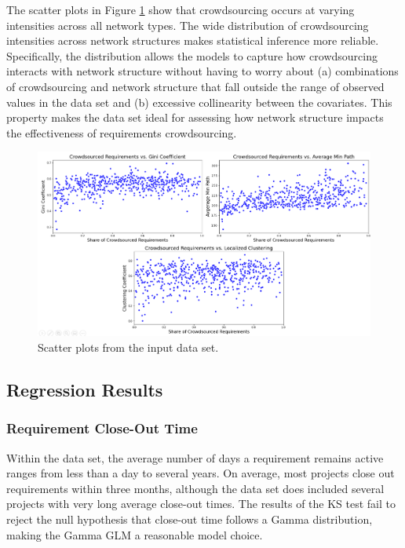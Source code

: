 The scatter plots in Figure \ref{network_structure_scatter} show that crowdsourcing occurs at varying intensities across all network types. The wide distribution of crowdsourcing intensities across network structures makes statistical inference more reliable. Specifically, the distribution allows the models to capture how crowdsourcing interacts with network structure without having to worry about (a) combinations of crowdsourcing and network structure that fall outside the range of observed values in the data set and (b) excessive collinearity between the covariates. This property makes the data set ideal for assessing how network structure impacts the effectiveness of requirements crowdsourcing.

\begin{figure}
  \includegraphics[width=.95\textwidth]{network_structure_scatter.PNG}
\caption{Scatter plots from the input data set.}
\label{network_structure_scatter}
\end{figure}

\subsection{Regression Results}

\subsubsection{Requirement Close-Out Time}

Within the data set, the average number of days a requirement remains active ranges from less than a day to several years. On average, most projects close out requirements within three months, although the data set does included several projects with very long average close-out times. The results of the KS test fail to reject the null hypothesis that close-out time follows a Gamma distribution, making the Gamma GLM a reasonable model choice.

